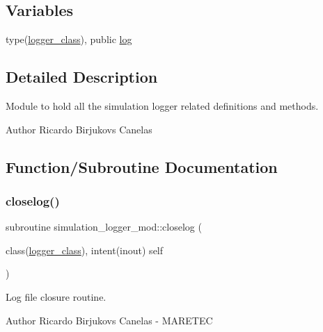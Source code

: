 \subsection*{Variables}
\begin{DoxyCompactItemize}
\item 
type(\mbox{\hyperlink{structsimulation__logger__mod_1_1logger__class}{logger\+\_\+class}}), public \mbox{\hyperlink{namespacesimulation__logger__mod_aa778de9905350741e1f40bb04fdc1cf6}{log}}
\end{DoxyCompactItemize}


\subsection{Detailed Description}
Module to hold all the simulation logger related definitions and methods. 

\begin{DoxyAuthor}{Author}
Ricardo Birjukovs Canelas 
\end{DoxyAuthor}


\subsection{Function/\+Subroutine Documentation}
\mbox{\label{namespacesimulation__logger__mod_aa6d1aaea74403186da0f98afb74ecebe}} 
\subsubsection{\texorpdfstring{closelog()}{closelog()}}
{\footnotesize\ttfamily subroutine simulation\+\_\+logger\+\_\+mod\+::closelog (\begin{DoxyParamCaption}\item[{class(\mbox{\hyperlink{structsimulation__logger__mod_1_1logger__class}{logger\+\_\+class}}), intent(inout)}]{self }\end{DoxyParamCaption})\hspace{0.3cm}{\ttfamily [private]}}



Log file closure routine. 

\begin{DoxyAuthor}{Author}
Ricardo Birjukovs Canelas -\/ M\+A\+R\+E\+T\+EC 
\end{DoxyAuthor}



